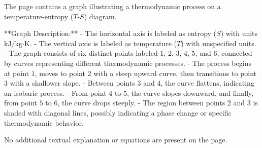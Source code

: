 The page contains a graph illustrating a thermodynamic process on a temperature-entropy (\( T \)-\( S \)) diagram.  

**Graph Description:**  
- The horizontal axis is labeled as entropy (\( S \)) with units \( \text{kJ/kg·K} \).  
- The vertical axis is labeled as temperature (\( T \)) with unspecified units.  
- The graph consists of six distinct points labeled \( 1 \), \( 2 \), \( 3 \), \( 4 \), \( 5 \), and \( 6 \), connected by curves representing different thermodynamic processes.  
- The process begins at point \( 1 \), moves to point \( 2 \) with a steep upward curve, then transitions to point \( 3 \) with a shallower slope.  
- Between points \( 3 \) and \( 4 \), the curve flattens, indicating an isobaric process.  
- From point \( 4 \) to \( 5 \), the curve slopes downward, and finally, from point \( 5 \) to \( 6 \), the curve drops steeply.  
- The region between points \( 2 \) and \( 3 \) is shaded with diagonal lines, possibly indicating a phase change or specific thermodynamic behavior.  

No additional textual explanation or equations are present on the page.